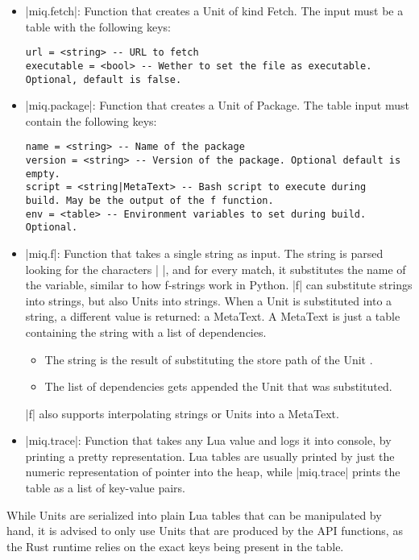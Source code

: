 \begin{itemize}
    \item |miq.fetch|: Function that creates a Unit of kind
    Fetch. The input must be a table with the following
    keys:
    \begin{verbatim}
url = <string> -- URL to fetch
executable = <bool> -- Wether to set the file as executable. Optional, default is false.
    \end{verbatim}

    \item |miq.package|: Function that creates a Unit of
    Package. The table input must contain the following
    keys:
    \begin{verbatim}
name = <string> -- Name of the package
version = <string> -- Version of the package. Optional default is empty.
script = <string|MetaText> -- Bash script to execute during
build. May be the output of the f function.
env = <table> -- Environment variables to set during build. Optional.
\end{verbatim}

    \item |miq.f|: Function that takes a single string as
    input. The string is parsed looking for the characters
    |{{ }}|, and for every match, it substitutes the name of
    the variable, similar to how f-strings work in Python.
    |f| can substitute strings into strings, but also Units
    into strings. When a Unit is substituted into a string,
    a different value is returned: a MetaText. A MetaText is
    just a table containing the string with a list of
    dependencies.
    \begin{itemize}
        \item The string is the result of substituting the
        store path of the Unit .
        \item The list of dependencies gets appended the
        Unit that was substituted.
    \end{itemize}
    |f| also supports interpolating strings or Units into a
    MetaText.

    \item |miq.trace|: Function that takes any Lua value and
    logs it into console, by printing a pretty
    representation. Lua tables are usually printed by just
    the numeric representation of pointer into the heap,
    while |miq.trace| prints the table as a list of
    key-value pairs.
\end{itemize}

While Units are serialized into plain Lua tables that can be
manipulated by hand, it is advised to only use Units that
are produced by the API functions, as the Rust runtime
relies on the exact keys being present in the table.

